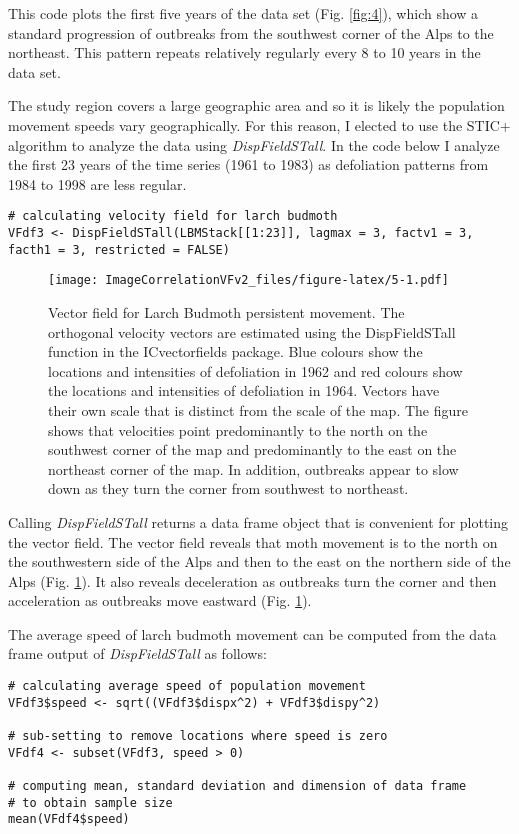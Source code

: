 This code plots the first five years of the data set (Fig. \ref{fig:4}), which show a standard progression of outbreaks from the southwest corner of the Alps to the northeast. This pattern repeats relatively regularly every 8 to 10 years in the data set.

The study region covers a large geographic area and so it is likely the population movement speeds vary geographically. For this reason, I elected to use the STIC+ algorithm to analyze the data using \emph{DispFieldSTall}. In the code below I analyze the first 23 years of the time series (1961 to 1983) as defoliation patterns from 1984 to 1998 are less regular.

\begin{verbatim}
# calculating velocity field for larch budmoth
VFdf3 <- DispFieldSTall(LBMStack[[1:23]], lagmax = 3, factv1 = 3, facth1 = 3, restricted = FALSE)
\end{verbatim}

\begin{figure}
\centering
\texttt{[image: ImageCorrelationVFv2\_files/figure-latex/5-1.pdf]}
\caption{\label{fig:5}Vector field for Larch Budmoth persistent movement. The orthogonal velocity vectors are estimated using the DispFieldSTall function in the ICvectorfields package. Blue colours show the locations and intensities of defoliation in 1962 and red colours show the locations and intensities of defoliation in 1964. Vectors have their own scale that is distinct from the scale of the map. The figure shows that velocities point predominantly to the north on the southwest corner of the map and predominantly to the east on the northeast corner of the map. In addition, outbreaks appear to slow down as they turn the corner from southwest to northeast.}
\end{figure}

Calling \emph{DispFieldSTall} returns a data frame object that is convenient for plotting the vector field. The vector field reveals that moth movement is to the north on the southwestern side of the Alps and then to the east on the northern side of the Alps (Fig. \ref{fig:5}). It also reveals deceleration as outbreaks turn the corner and then acceleration as outbreaks move eastward (Fig. \ref{fig:5}).

The average speed of larch budmoth movement can be computed from the data frame output of \emph{DispFieldSTall} as follows:

\begin{verbatim}
# calculating average speed of population movement
VFdf3$speed <- sqrt((VFdf3$dispx^2) + VFdf3$dispy^2)

# sub-setting to remove locations where speed is zero
VFdf4 <- subset(VFdf3, speed > 0)

# computing mean, standard deviation and dimension of data frame
# to obtain sample size
mean(VFdf4$speed)
\end{verbatim}

